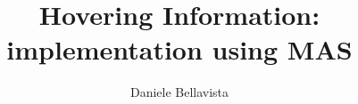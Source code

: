 \documentclass[11pt]{article}
\newcommand{\xauth}{Daniele Bellavista}
\newcommand{\xtitle}{Hovering Information: implementation using MAS}
\begin{document}
\title{\xtitle}
\author{\xauth}

\maketitle




%


\nocite{*}
{}
\end{document}
